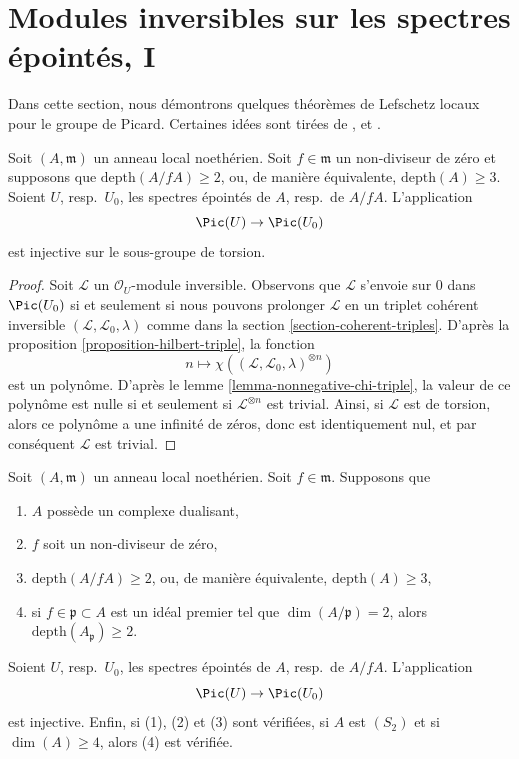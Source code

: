\section{Modules inversibles sur les spectres épointés, I}
\label{section-local-lefschetz-for-pic}

\noindent
Dans cette section, nous démontrons quelques théorèmes de Lefschetz locaux pour le groupe de Picard.
Certaines idées sont tirées de
\cite{Kollar-pic}, \cite{Bhatt-local} et \cite{Kollar-map-pic}.

\begin{lemma}
\label{lemma-injective-torsion-in-pic}
Soit $(A, \mathfrak m)$ un anneau local noethérien. Soit $f \in \mathfrak m$
un non-diviseur de zéro et supposons que $\text{depth}(A/fA) \geq 2$, ou, de manière équivalente,
$\text{depth}(A) \geq 3$. Soient $U$, resp.\ $U_0$, les spectres épointés
de $A$, resp.\ de $A/fA$. L'application
$$
\Pic(U) \to \Pic(U_0)
$$
est injective sur le sous-groupe de torsion.
\end{lemma}

\begin{proof}
Soit $\mathcal{L}$ un $\mathcal{O}_U$-module inversible.
Observons que $\mathcal{L}$ s'envoie sur $0$ dans $\Pic(U_0)$
si et seulement si nous pouvons prolonger $\mathcal{L}$ en un triplet cohérent
inversible $(\mathcal{L}, \mathcal{L}_0, \lambda)$
comme dans la section \ref{section-coherent-triples}.
D'après la proposition \ref{proposition-hilbert-triple},
la fonction
$$
n \longmapsto \chi((\mathcal{L}, \mathcal{L}_0, \lambda)^{\otimes n})
$$
est un polynôme. D'après le lemme \ref{lemma-nonnegative-chi-triple},
la valeur de ce polynôme est nulle si et seulement si
$\mathcal{L}^{\otimes n}$ est trivial.
Ainsi, si $\mathcal{L}$ est de torsion, alors ce
polynôme a une infinité de zéros, donc est
identiquement nul, et par conséquent $\mathcal{L}$ est trivial.
\end{proof}

\begin{proposition}[Koll\'ar]
\label{proposition-injective-pic}
\begin{reference}
\cite[Theorem 1.9]{Kollar-map-pic}
\end{reference}
Soit $(A, \mathfrak m)$ un anneau local noethérien. Soit $f \in \mathfrak m$.
Supposons que
\begin{enumerate}
\item $A$ possède un complexe dualisant,
\item $f$ soit un non-diviseur de zéro,
\item $\text{depth}(A/fA) \geq 2$, ou, de manière équivalente, $\text{depth}(A) \geq 3$,
\item si $f \in \mathfrak p \subset A$ est un idéal premier tel que
$\dim(A/\mathfrak p) = 2$, alors $\text{depth}(A_\mathfrak p) \geq 2$.
\end{enumerate}
Soient $U$, resp.\ $U_0$, les spectres épointés de $A$, resp.\ de $A/fA$. L'application
$$
\Pic(U) \to \Pic(U_0)
$$
est injective. Enfin, si (1), (2) et (3) sont vérifiées, si $A$ est $(S_2)$ et si
$\dim(A) \geq 4$, alors (4) est vérifiée.
\end{proposition}

